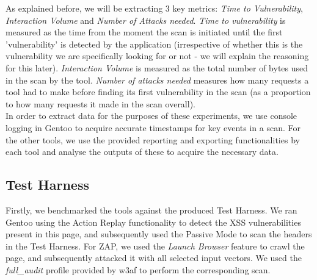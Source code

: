 As explained before, we will be extracting 3 key metrics: \textit{Time to Vulnerability}, \textit{Interaction Volume} and \textit{Number of Attacks needed}. \textit{Time to vulnerability} is measured as the time from the moment the scan is initiated until the first 'vulnerability' is detected by the application (irrespective of whether this is the vulnerability we are specifically looking for or not - we will explain the reasoning for this later). \textit{Interaction Volume} is measured as the total number of bytes used in the scan by the tool. \textit{Number of attacks needed} measures how many requests a tool had to make before finding its first vulnerability in the scan (as a proportion to how many requests it made in the scan overall). \\ 

In order to extract data for the purposes of these experiments, we use console logging in Gentoo to acquire accurate timestamps for key events in a scan. For the other tools, we use the provided reporting and exporting functionalities by each tool and analyse the outputs of these to acquire the necessary data. \\

\subsection{Test Harness}

Firstly, we benchmarked the tools against the produced Test Harness. We ran Gentoo using the Action Replay functionality to detect the XSS vulnerabilities present in this page, and subsequently used the Passive Mode to scan the headers in the Test Harness. For ZAP, we used the \textit{Launch Browser} feature to crawl the page, and subsequently attacked it with all selected input vectors. We used the \textit{full\_audit} profile provided by w3af to perform the corresponding scan. \\

